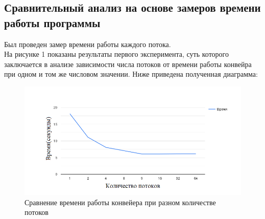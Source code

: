 \documentclass[a4paper, 12pt]{article}
\begin{document}
\begin{flushleft}
	\subsection{Сравнительный анализ на основе замеров времени работы программы}
	Был проведен замер времени работы каждого потока.
	\\ \hspace*{5mm} На рисунке 1 показаны результаты первого эксперимента, суть которого заключается в анализе зависимости числа потоков от времени работы конвейра при одном и том же числовом значении. Ниже приведена полученная диаграмма:
	\begin{figure}[h]
		\centering \includegraphics[scale=2]{chart (1)}
		\centering\caption{Сравнение времени работы конвейера при разном количестве потоков}
	\end{figure}
	

\end{flushleft}
\end{document}
